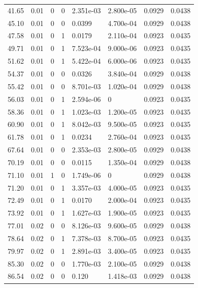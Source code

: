 \documentclass[preview]{standalone}
\begin{document}
{{\begin{tabular}{L{1.2cm}C{1.2cm} C{0.3cm}C{0.5cm} C{1.4cm}C{1.4cm} C{1.4cm}C{1.4cm}}
  41.65  &  0.01  & 0     &  0 &  2.351e-03  & 2.800e-05  & 0.0929 &  0.0438   \\ 
  45.10  &  0.01  & 0     &  0 &  0.0399  & 4.700e-04  & 0.0929 &  0.0438   \\ 
  47.58  &  0.01  & 0     &  1 &  0.0179  & 2.110e-04  & 0.0923 &  0.0435   \\ 
  49.71  &  0.01  & 0     &  1 &  7.523e-04  & 9.000e-06  & 0.0923 &  0.0435   \\ 
  51.62  &  0.01  & 0     &  1 &  5.422e-04  & 6.000e-06  & 0.0923 &  0.0435   \\ 
  54.37  &  0.01  & 0     &  0 &  0.0326  & 3.840e-04  & 0.0929 &  0.0438   \\ 
  55.42  &  0.01  & 0     &  0 &  8.701e-03  & 1.020e-04  & 0.0929 &  0.0438   \\ 
  56.03  &  0.01  & 0     &  1 &  2.594e-06  & 0  & 0.0923 &  0.0435   \\ 
  58.36  &  0.01  & 0     &  1 &  1.023e-03  & 1.200e-05  & 0.0923 &  0.0435   \\ 
  60.90  &  0.01  & 0     &  1 &  8.042e-03  & 9.500e-05  & 0.0923 &  0.0435   \\ 
  61.78  &  0.01  & 0     &  1 &  0.0234  & 2.760e-04  & 0.0923 &  0.0435   \\ 
  67.64  &  0.01  & 0     &  0 &  2.353e-03  & 2.800e-05  & 0.0929 &  0.0438   \\ 
  70.19  &  0.01  & 0     &  0 &  0.0115  & 1.350e-04  & 0.0929 &  0.0438   \\ 
  71.10  &  0.01  & 1     &  0 &  1.749e-06  & 0  & 0.0929 &  0.0438   \\ 
  71.20  &  0.01  & 0     &  1 &  3.357e-03  & 4.000e-05  & 0.0923 &  0.0435   \\ 
  72.49  &  0.01  & 0     &  1 &  0.0170  & 2.000e-04  & 0.0923 &  0.0435   \\ 
  73.92  &  0.01  & 0     &  1 &  1.627e-03  & 1.900e-05  & 0.0923 &  0.0435   \\ 
  77.01  &  0.02  & 0     &  0 &  8.126e-03  & 9.600e-05  & 0.0929 &  0.0438   \\ 
  78.64  &  0.02  & 0     &  1 &  7.378e-03  & 8.700e-05  & 0.0923 &  0.0435   \\ 
  79.97  &  0.02  & 0     &  1 &  2.891e-03  & 3.400e-05  & 0.0923 &  0.0435   \\ 
  85.30  &  0.02  & 0     &  0 &  1.770e-03  & 2.100e-05  & 0.0929 &  0.0438   \\ 
  86.54  &  0.02  & 0     &  0 &  0.120  & 1.418e-03  & 0.0929 &  0.0438   \\ 

\end{tabular}}}
\end{document}
